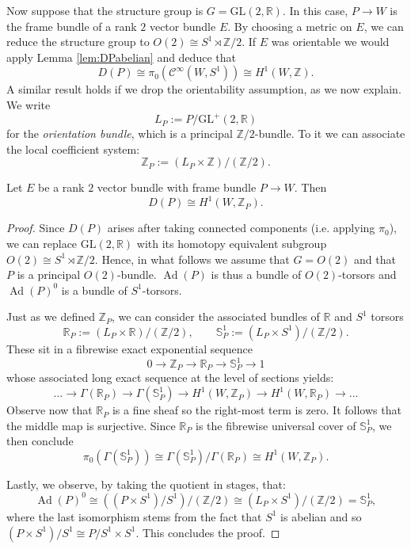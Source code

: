 \documentclass[10pt]{amsart}
\newcommand{\C}{\mathcal{C}}
\DeclareMathOperator{\Ad}{Ad}
\numberwithin{theoremalpha}{section}
\numberwithin{equation}{section}
\numberwithin{definition}{section}
\numberwithin{theorem}{section}
\numberwithin{proposition}{section}
\numberwithin{lemma}{section}
\numberwithin{example}{section}
\numberwithin{remark}{section}
\numberwithin{corollary}{section}
\numberwithin{question}{section}
\numberwithin{problem}{section}
\numberwithin{assumption}{section}
\theoremstyle{named}
\numberwithin{equation}{section}
\begin{document}
Now suppose that the structure group is $G = \mathrm{GL}(2, \mathbb{R})$. In this case, $P \to W$ is the frame bundle of a rank $2$ vector bundle $E$. By choosing a metric on $E$, we can reduce the structure group to $O(2) \cong S^1 \rtimes \mathbb{Z}/2$. If $E$ was orientable we would apply Lemma \ref{lem:DPabelian} and deduce that
\[ D(P) \cong \pi_0(\C^\infty(W,S^1)) \cong H^{1}(W, \mathbb{Z}). \]
A similar result holds if we drop the orientability assumption, as we now explain. We write 
\[ L_P := P/\mathrm{GL}^+(2, \mathbb{R}) \]
for the \emph{orientation bundle}, which is a principal $\mathbb{Z}/2$-bundle. To it we can associate the local coefficient system:
\[ \mathbb{Z}_{P} := (L_{P} \times \mathbb{Z})/(\mathbb{Z}/2). \]
\begin{lemma}\label{lem:final}
Let $E$ be a rank $2$ vector bundle with frame bundle $P \to W$. Then 
\[ D(P) \cong H^{1}(W, \mathbb{Z}_{P}). \]
\end{lemma}
\begin{proof}
Since $D(P)$ arises after taking connected components (i.e. applying $\pi_0$), we can replace $\mathrm{GL}(2, \mathbb{R})$ with its homotopy equivalent subgroup $O(2) \cong S^1 \rtimes \mathbb{Z}/2$. Hence, in what follows we assume that $G = O(2)$ and that $P$ is a principal $O(2)$-bundle. $\Ad(P)$ is thus a bundle of $O(2)$-torsors and $\Ad(P)^0$ is a bundle of $S^1$-torsors.

Just as we defined $\mathbb{Z}_{P}$, we can consider the associated bundles of $\mathbb{R}$ and $S^1$ torsors
\[ \mathbb{R}_{P} := (L_{P} \times \mathbb{R})/(\mathbb{Z}/2), \qquad \mathbb{S}_{P}^1 := (L_{P} \times S^1)/(\mathbb{Z}/2). \]
These sit in a fibrewise exact exponential sequence
\[ 0 \to \mathbb{Z}_{P} \to \mathbb{R}_{P} \to \mathbb{S}^1_{P} \to 1 \]
whose associated long exact sequence at the level of sections yields:
\[ ... \to \Gamma(\mathbb{R}_{P}) \to \Gamma(\mathbb{S}^1_{P}) \to H^{1}(W, \mathbb{Z}_{P}) \to H^{1}(W, \mathbb{R}_{P}) \to ... \]
Observe now that $\mathbb{R}_{P}$ is a fine sheaf so the right-most term is zero. It follows that the middle map is surjective. Since $\mathbb{R}_{P}$ is the fibrewise universal cover of $\mathbb{S}^1_{P}$, we then conclude 
\[ \pi_{0}(\Gamma(\mathbb{S}^1_{P})) \cong \Gamma(\mathbb{S}^1_{P})/\Gamma(\mathbb{R}_{P}) \cong H^{1}(W, \mathbb{Z}_{P}). \]

Lastly, we observe, by taking the quotient in stages, that:
\[ \Ad(P)^0  \cong ((P \times S^1)/S^1)/(\mathbb{Z}/2) \cong (L_{P} \times S^1)/(\mathbb{Z}/2) = \mathbb{S}^1_{P}, \]
where the last isomorphism stems from the fact that $S^1$ is abelian and so $(P \times S^1)/S^1 \cong P/S^1 \times S^1$. This concludes the proof.
\end{proof}





 
\end{document}
